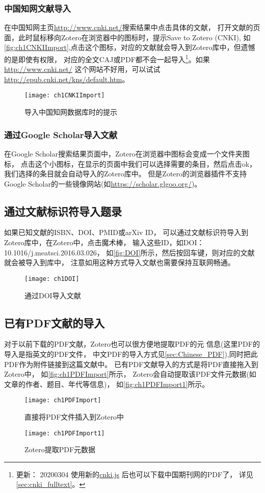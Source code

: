 \documentclass[cn,11pt,chinese]{elegantbook}
\begin{document}
	\subsubsection{中国知网文献导入} \label{sec:cnki}
	在中国知网主页\url{http://www.cnki.net/}搜索结果中点击具体的文献，
	打开文献的页面，此时鼠标移向Zotero在浏览器中的图标时，提示Save to Zotero (CNKI),
	如\autoref{fig:ch1CNKIImport},点击这个图标，对应的文献就会导入到Zotero库中，但遗憾的是即使有权限，
	对应的全文CAJ或PDF都不会一起导入\footnote{更新：
	20200304 使用新的\href{https://github.com/Zotero-CN/translators_CN}{cnki.js}
	后也可以下载中国期刊网的PDF了，
	详见\cref{sec:cnki_fulltext}。}。如果\url{http://www.cnki.net/}
	这个网站不好用，可以试试\url{http://epub.cnki.net/kns/default.htm}。
	\begin{figure}[htbp]
		\centering
		\texttt{[image: ch1CNKIImport]}
		\caption{导入中国知网数据库时的提示}
		\label{fig:ch1CNKIImport}
	\end{figure}
	\subsubsection{通过Google Scholar导入文献}
	在Google Scholar搜索结果页面中，Zotero在浏览器中图标会变成一个文件夹图标，
	点击这个小图标，在显示的页面中我们可以选择需要的条目，然后点击ok，
	我们选择的条目就会自动导入的Zotero库中。
	但是Zotero的浏览器插件不支持Google Scholar的一些镜像网站(如\url{https://scholar.glgoo.org/})。
	\subsection{通过文献标识符导入题录}
	如果已知文献的ISBN、DOI、PMID或arXiv ID，
	可以通过文献标识符导入到Zotero库中，在Zotero中，点击魔术棒，
	输入这些ID，如DOI：10.1016/j.meatsci.2016.03.026，
	如\autoref{fig:DOI}所示，然后按回车键，则对应的文献就会被导入到库中，
	注意如用这种方式导入文献也需要保持互联网畅通。
	\begin{figure}[htbp]
		\centering
		\texttt{[image: ch1DOI]}
		\caption{通过DOI导入文献}
		\label{fig:DOI}
	\end{figure}

	\subsection{已有PDF文献的导入} \label{sec:EngPDFIm}
	对于以前下载的PDF文献，Zotero也可以很方便地提取PDF的元
	信息(这里PDF的导入是指英文的PDF文件，
	中文PDF的导入方式见\cref{sec:Chinese_PDF}),同时把此PDF作为附件链接到这篇文献中。
	已有PDF文献导入的方式是将PDF直接拖入到Zotero中，
	如\autoref{fig:ch1PDFImport}所示，
	Zotero会自动提取该PDF文件元数据(如文章的作者、题目、年代等信息)，
	如\autoref{fig:ch1PDFImport1}所示。
	\begin{figure}[htbp]
		\centering
		\texttt{[image: ch1PDFImport]}
		\caption{直接将PDF文件插入到Zotero中}
		\label{fig:ch1PDFImport}
	\end{figure}
	\begin{figure}[htbp]
		\centering
		\texttt{[image: ch1PDFImport1]}
		\caption{Zotero提取PDF元数据}
		\label{fig:ch1PDFImport1}
	\end{figure}
	
\end{document}
